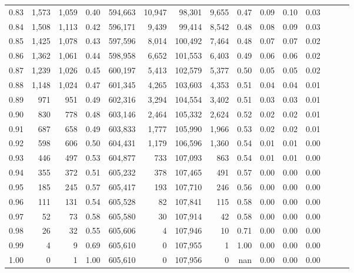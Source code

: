 \begin{tabular}{rrrrrrrrrrrrrrr}
0.83 &   1,573 &  1,059 &  0.40 &  594,663 &   10,947 &   98,301 &    9,655 &  0.47 &  0.09 &  0.10 &      0.03 \\
0.84 &   1,508 &  1,113 &  0.42 &  596,171 &    9,439 &   99,414 &    8,542 &  0.48 &  0.08 &  0.09 &      0.03 \\
0.85 &   1,425 &  1,078 &  0.43 &  597,596 &    8,014 &  100,492 &    7,464 &  0.48 &  0.07 &  0.07 &      0.02 \\
0.86 &   1,362 &  1,061 &  0.44 &  598,958 &    6,652 &  101,553 &    6,403 &  0.49 &  0.06 &  0.06 &      0.02 \\
0.87 &   1,239 &  1,026 &  0.45 &  600,197 &    5,413 &  102,579 &    5,377 &  0.50 &  0.05 &  0.05 &      0.02 \\
0.88 &   1,148 &  1,024 &  0.47 &  601,345 &    4,265 &  103,603 &    4,353 &  0.51 &  0.04 &  0.04 &      0.01 \\
0.89 &     971 &    951 &  0.49 &  602,316 &    3,294 &  104,554 &    3,402 &  0.51 &  0.03 &  0.03 &      0.01 \\
0.90 &     830 &    778 &  0.48 &  603,146 &    2,464 &  105,332 &    2,624 &  0.52 &  0.02 &  0.02 &      0.01 \\
0.91 &     687 &    658 &  0.49 &  603,833 &    1,777 &  105,990 &    1,966 &  0.53 &  0.02 &  0.02 &      0.01 \\
0.92 &     598 &    606 &  0.50 &  604,431 &    1,179 &  106,596 &    1,360 &  0.54 &  0.01 &  0.01 &      0.00 \\
0.93 &     446 &    497 &  0.53 &  604,877 &      733 &  107,093 &      863 &  0.54 &  0.01 &  0.01 &      0.00 \\
0.94 &     355 &    372 &  0.51 &  605,232 &      378 &  107,465 &      491 &  0.57 &  0.00 &  0.00 &      0.00 \\
0.95 &     185 &    245 &  0.57 &  605,417 &      193 &  107,710 &      246 &  0.56 &  0.00 &  0.00 &      0.00 \\
0.96 &     111 &    131 &  0.54 &  605,528 &       82 &  107,841 &      115 &  0.58 &  0.00 &  0.00 &      0.00 \\
0.97 &      52 &     73 &  0.58 &  605,580 &       30 &  107,914 &       42 &  0.58 &  0.00 &  0.00 &      0.00 \\
0.98 &      26 &     32 &  0.55 &  605,606 &        4 &  107,946 &       10 &  0.71 &  0.00 &  0.00 &      0.00 \\
0.99 &       4 &      9 &  0.69 &  605,610 &        0 &  107,955 &        1 &  1.00 &  0.00 &  0.00 &      0.00 \\
1.00 &       0 &      1 &  1.00 &  605,610 &        0 &  107,956 &        0 &   nan &  0.00 &  0.00 &      0.00 \\
\bottomrule
\end{tabular}
